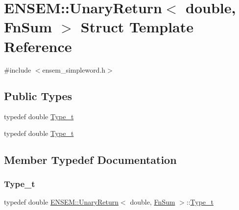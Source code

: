 \hypertarget{structENSEM_1_1UnaryReturn_3_01double_00_01FnSum_01_4}{}\section{E\+N\+S\+EM\+:\+:Unary\+Return$<$ double, Fn\+Sum $>$ Struct Template Reference}
\label{structENSEM_1_1UnaryReturn_3_01double_00_01FnSum_01_4}


{\ttfamily \#include $<$ensem\+\_\+simpleword.\+h$>$}

\subsection*{Public Types}
\begin{DoxyCompactItemize}
\item 
typedef double \mbox{\hyperlink{structENSEM_1_1UnaryReturn_3_01double_00_01FnSum_01_4_ad107c064fb27f30146a624a7378978bb}{Type\+\_\+t}}
\item 
typedef double \mbox{\hyperlink{structENSEM_1_1UnaryReturn_3_01double_00_01FnSum_01_4_ad107c064fb27f30146a624a7378978bb}{Type\+\_\+t}}
\end{DoxyCompactItemize}


\subsection{Member Typedef Documentation}
\mbox{\label{structENSEM_1_1UnaryReturn_3_01double_00_01FnSum_01_4_ad107c064fb27f30146a624a7378978bb}} 
\subsubsection{\texorpdfstring{Type\_t}{Type\_t}\hspace{0.1cm}{\footnotesize\ttfamily [1/2]}}
{\footnotesize\ttfamily typedef double \mbox{\hyperlink{structENSEM_1_1UnaryReturn}{E\+N\+S\+E\+M\+::\+Unary\+Return}}$<$ double, \mbox{\hyperlink{structENSEM_1_1FnSum}{Fn\+Sum}} $>$\+::\mbox{\hyperlink{structENSEM_1_1UnaryReturn_3_01double_00_01FnSum_01_4_ad107c064fb27f30146a624a7378978bb}{Type\+\_\+t}}}

\mbox{\label{structENSEM_1_1UnaryReturn_3_01double_00_01FnSum_01_4_ad107c064fb27f30146a624a7378978bb}} 
